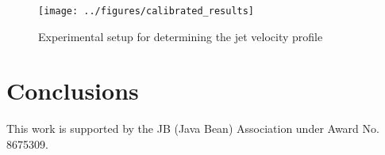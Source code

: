 \documentclass[article]{proc}
\begin{document}
\begin{figure}
    \centering
    \texttt{[image: ../figures/calibrated\_results]}
    \caption{Experimental setup for determining the jet velocity profile}
    \label{fig:cal_results}
\end{figure}

\section{Conclusions}



\acknowledgements

This work is supported by the JB (Java Bean) Association under Award No. 8675309.


\scriptsize{

}
\end{document}
